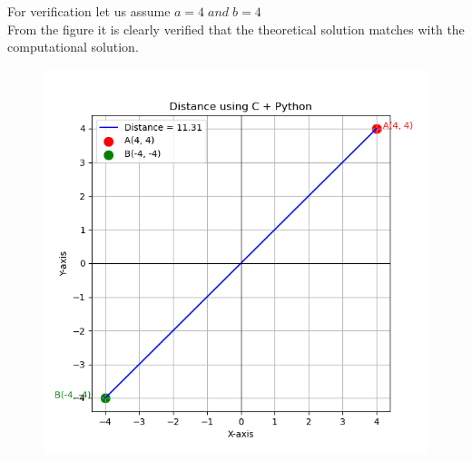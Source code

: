 \documentclass[journal]{IEEEtran}
\theoremstyle{remark}
\begin{document}
For verification let us assume $a=4\;and\; b=4$\\
From the figure it is clearly verified that the theoretical solution matches with the computational solution.\\
\begin{figure}[h]
    \centering
    \includegraphics[height=0.5\textheight, keepaspectratio]{figs/figure1.png}
    \label{figure_1}
\end{figure}
\end{document}
